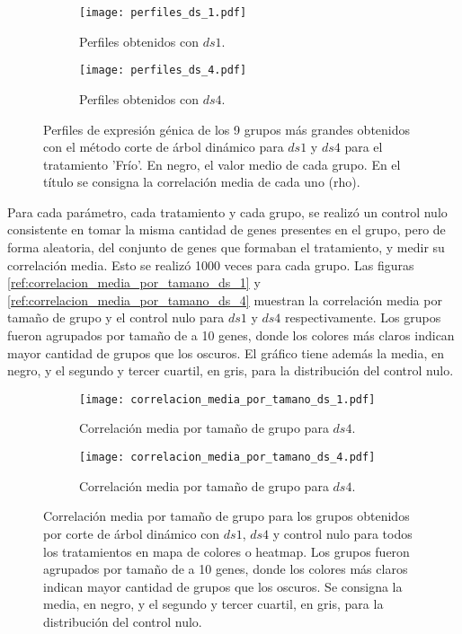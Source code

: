 \begin{sidewaysfigure}[H]
    \centering
    \begin{subfigure}[t]{0.45\textwidth}
    \centering
    \texttt{[image: perfiles\_ds\_1.pdf]}
    \caption{Perfiles obtenidos con $ds1$.}
    \label{fig:perfiles_ds_1}
    \end{subfigure}
    \begin{subfigure}[t]{0.45\textwidth}
    \centering
    \texttt{[image: perfiles\_ds\_4.pdf]}
    \caption{Perfiles obtenidos con $ds4$.}
    \label{fig:perfiles_ds_4}
    \end{subfigure}
    \caption{Perfiles de expresión génica de los 9 grupos más grandes obtenidos con el método corte de árbol dinámico para $ds1$ y $ds4$ para el tratamiento 'Frío'. En negro, el valor medio de cada grupo. En el título se consigna la correlación media de cada uno (rho).}
\end{sidewaysfigure}
Para cada parámetro, cada tratamiento y cada grupo, se realizó un control nulo consistente en tomar la misma cantidad de genes presentes en el grupo, pero de forma aleatoria, del conjunto de genes que formaban el tratamiento, y medir su correlación media. Esto se realizó 1000 veces para cada grupo. Las figuras \ref{ref:correlacion_media_por_tamano_ds_1} y \ref{ref:correlacion_media_por_tamano_ds_4} muestran la correlación media por tamaño de grupo y el control nulo para $ds1$ y $ds4$ respectivamente. Los grupos fueron agrupados por tamaño de a 10 genes, donde los colores más claros indican mayor cantidad de grupos que los oscuros. El gráfico tiene además la media, en negro, y el segundo y tercer cuartil, en gris, para la distribución del control nulo.
\begin{sidewaysfigure}[H]
    \centering
    \begin{subfigure}[t]{0.45\textwidth}
    \centering
    \texttt{[image: correlacion\_media\_por\_tamano\_ds\_1.pdf]}
    \caption{Correlación media por tamaño de grupo para $ds4$.}
    \label{fig:correlacion_media_por_tamano_ds_1}
    \end{subfigure}
    \begin{subfigure}[t]{0.45\textwidth}
    \centering
    \texttt{[image: correlacion\_media\_por\_tamano\_ds\_4.pdf]}
    \caption{Correlación media por tamaño de grupo para $ds4$.}
    \label{fig:correlacion_media_por_tamano_ds_4}
    \end{subfigure}
    \caption{Correlación media por tamaño de grupo para los grupos obtenidos por corte de árbol dinámico con $ds1$, $ds4$ y control nulo para todos los tratamientos en mapa de colores o heatmap. Los grupos fueron agrupados por tamaño de a 10 genes, donde los colores más claros indican mayor cantidad de grupos que los oscuros. Se consigna la media, en negro, y el segundo y tercer cuartil, en gris, para la distribución del control nulo.}
\end{sidewaysfigure}
